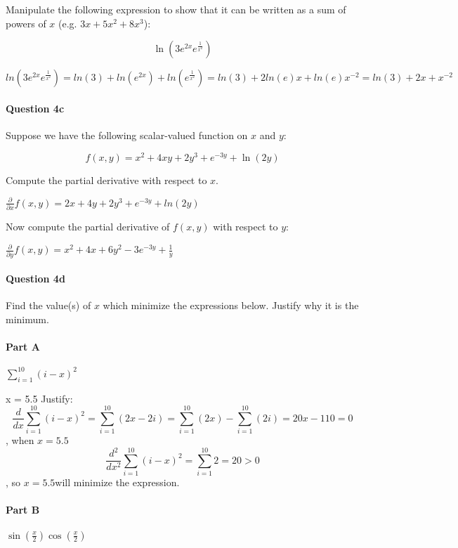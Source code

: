\documentclass[11pt]{article}
\begin{document}
Manipulate the following expression to show that it can be written as a
sum of powers of \(x\) (e.g. \(3x + 5x^2 + 8x^3\)):

\[
    \ln \left( 3 e^{2  x} e^{\frac{1}{x^2}} \right)
\]

    \(ln(3e^{2x}e^{\frac{1}{x^2}})=ln(3)+ln(e^{2x})+ln(e^{\frac{1} {x^2}})=ln(3)+2ln(e)x+ln(e)x^{-2}=ln(3)+2x+x^{-2}\)

    \paragraph{Question 4c}\label{question-4c}

Suppose we have the following scalar-valued function on \(x\) and \(y\):

\[ f(x, y) = x^2 + 4xy + 2y^3 + e^{-3y} + \ln(2y) \]

Compute the partial derivative with respect to \(x\).

    \(\frac{\partial}{\partial x}f(x,y)=2x+4y+2y^3+e^{-3y}+ln(2y)\)

    Now compute the partial derivative of \(f(x,y)\) with respect to \(y\):

    \(\frac{\partial}{\partial y}f(x,y)=x^2+4x+6y^2-3e^{-3y}+\frac{1}{y}\)

    \paragraph{Question 4d}\label{question-4d}

Find the value(s) of \(x\) which minimize the expressions below. Justify
why it is the minimum.

    \paragraph{Part A}\label{part-a}

\(\sum_{i=1}^{10} (i - x)^2\)

    x = 5.5 Justify:
\[\frac{d}{dx}\sum_{i=1}^{10}(i-x)^2=\sum_{i=1}^{10}(2x-2i)=\sum_{i=1}^{10}(2x)-\sum_{i=1}^{10}(2i)=20x-110=0\],
when \(x=5.5\)
\[\frac{d^2}{dx^2}\sum_{i=1}^{10}(i-x)^2=\sum_{i=1}^{10}2=20>0\], so
\(x=5.5\)will minimize the expression.

    \paragraph{Part B}\label{part-b}

\(\sin\left(\frac{x}{2}\right)\cos\left(\frac{x}{2}\right)\)
\end{document}
